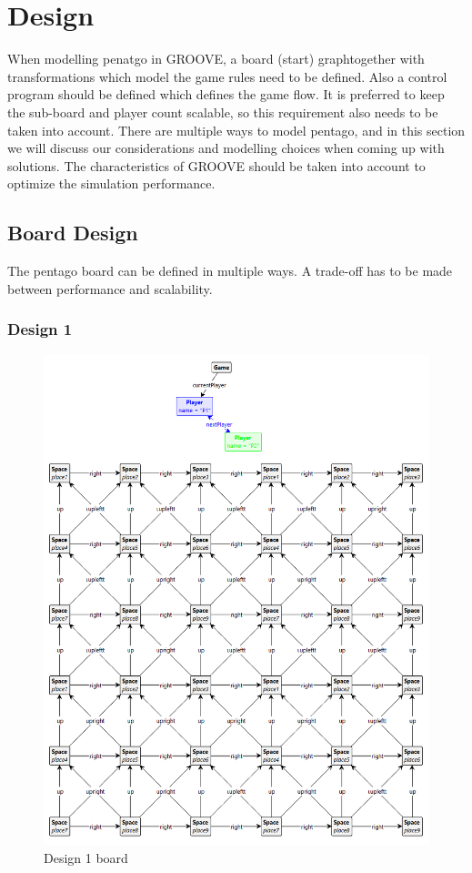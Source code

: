 \section{Design}
\label{Design}
When modelling penatgo in GROOVE, a board (start) graphtogether with transformations which model the game rules need to be defined.
Also a control program should be defined which defines the game flow.
It is preferred to keep the sub-board and player count scalable, so this requirement also needs to be taken into account.
There are multiple ways to model pentago, and in this section we will discuss our considerations and modelling choices when coming up with solutions.
The characteristics of GROOVE should be taken into account to optimize the simulation performance.

\subsection{Board Design}
The pentago board can be defined in multiple ways.
A trade-off has to be made between performance and scalability.

\subsubsection{Design 1}
\label{des1-board-design}

\begin{figure}[!h]
    \centering
    \includegraphics[scale=0.35,clip]{Images/board1.png}
    \caption{Design 1 board}
    \label{fig:board1}
\end{figure}

